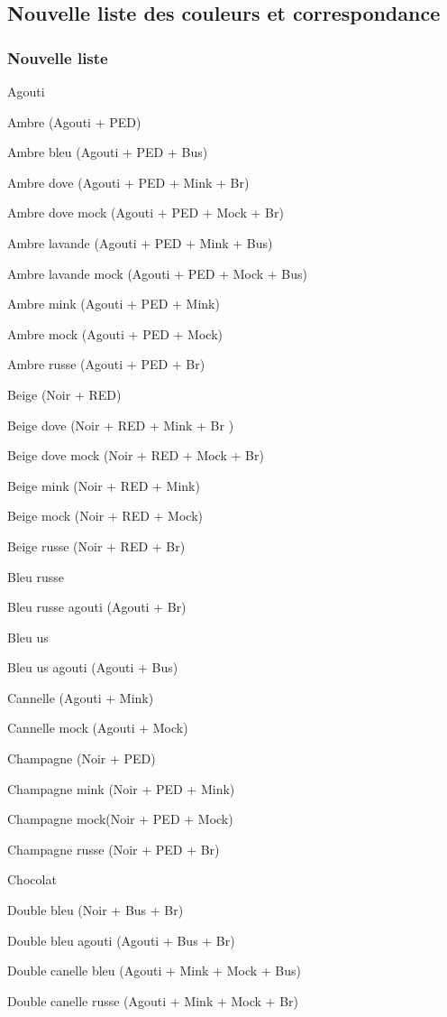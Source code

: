 \documentclass[a4paper,10pt]{article}
\begin{document}
\subsection{Nouvelle liste des couleurs et correspondance}
\subsubsection{Nouvelle liste}
Agouti

Ambre (Agouti + PED)
 
Ambre bleu   (Agouti + PED + Bus)
 
Ambre dove   (Agouti + PED + Mink + Br)
 
Ambre dove mock   (Agouti + PED + Mock + Br)
 
Ambre lavande (Agouti + PED + Mink +   Bus)
 
Ambre lavande mock (Agouti + PED + Mock   + Bus)
 
Ambre mink   (Agouti + PED + Mink)
 
Ambre mock (Agouti + PED + Mock)
 
Ambre russe (Agouti + PED + Br)
 
Beige (Noir + RED)
 
Beige dove (Noir   + RED + Mink + Br )
 
Beige dove mock (Noir + RED + Mock + Br)
 
Beige mink (Noir   + RED + Mink)
 
Beige mock (Noir + RED + Mock)
 
Beige russe (Noir + RED + Br)
 
Bleu russe
 
Bleu russe agouti (Agouti + Br)
 
Bleu us
 
Bleu us agouti   (Agouti + Bus)
 
Cannelle (Agouti + Mink)
 
Cannelle mock (Agouti + Mock)
 
Champagne (Noir + PED)
 
Champagne mink (Noir + PED + Mink)

Champagne mock(Noir + PED + Mock)
 
Champagne russe (Noir + PED + Br)
 
Chocolat
 
Double bleu (Noir + Bus + Br)
 
Double bleu agouti (Agouti + Bus + Br)
 
Double canelle bleu (Agouti + Mink +   Mock + Bus)
 
Double canelle russe (Agouti + Mink + Mock + Br)
 
\end{document}
